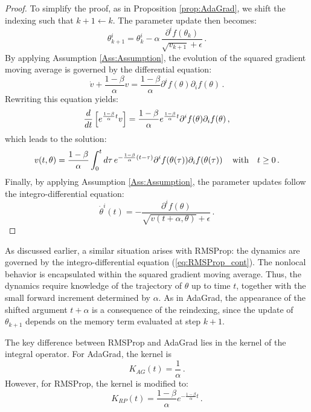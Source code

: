 \documentclass{article} %
\newcommand{\D}{{\rm d}}
\begin{document}
\begin{proof}
To simplify the proof, as in Proposition \ref{prop:AdaGrad}, we shift the indexing such that \(k+1 \leftarrow k\). The parameter update then becomes:
\[
\theta^i_{k+1} = \theta^i_{k} - \alpha\, \frac{\partial^i f(\theta_k)}{\sqrt{v_{k+1}} + \epsilon}\,.
\]
By applying Assumption \ref{Ass:Assumption}, the evolution of the squared gradient moving average is governed by the differential equation:
\begin{equation}
\dot{v} + \frac{1-\beta}{\alpha} v = \frac{1-\beta}{\alpha} \partial^i f(\theta) \partial_i f(\theta)\,.
\end{equation}
Rewriting this equation yields:
\begin{equation}
\frac{\D}{\D t}\left[e^{\frac{1-\beta}{\alpha} t} v \right] = \frac{1-\beta}{\alpha} e^{\frac{1-\beta}{\alpha}t} \partial^i f(\theta) \partial_i f(\theta)\,,
\end{equation}
which leads to the solution:
\begin{equation}
v(t,\theta) = \frac{1-\beta}{\alpha} \int^t_0 \D \tau \, e^{-\frac{1-\beta}{\alpha}(t-\tau)} \partial^i f(\theta(\tau)) \partial_i f(\theta(\tau))\, \quad \text{with} \quad t \geq 0\,.
\end{equation}
Finally, by applying Assumption \ref{Ass:Assumption}, the parameter updates follow the integro-differential equation:
\begin{equation}
\dot{\theta}^i(t) = - \frac{\partial^i f(\theta)}{\sqrt{v(t + \alpha, \theta)} + \epsilon}\,.
\end{equation}
\end{proof}
As discussed earlier, a similar situation arises with RMSProp: the dynamics are governed by the integro-differential equation (\ref{eq:RMSProp_cont}). The nonlocal behavior is encapsulated within the squared gradient moving average. Thus, the dynamics require knowledge of the trajectory of \(\theta\) up to time \(t\), together with the small forward increment determined by \(\alpha\). As in AdaGrad, the appearance of the shifted argument \(t+\alpha\) is a consequence of the reindexing, since the update of \(\theta_{k+1}\) depends on the memory term evaluated at step \(k+1\).

The key difference between RMSProp and AdaGrad lies in the kernel of the integral operator. For AdaGrad, the kernel is 
\[
K_{AG}(t) = \frac{1}{\alpha}\,.
\] 
However, for RMSProp, the kernel is modified to:
\[
K_{RP}(t) = \frac{1-\beta}{\alpha} e^{-\frac{1-\beta}{\alpha}t}\,.
\]
\end{document}

